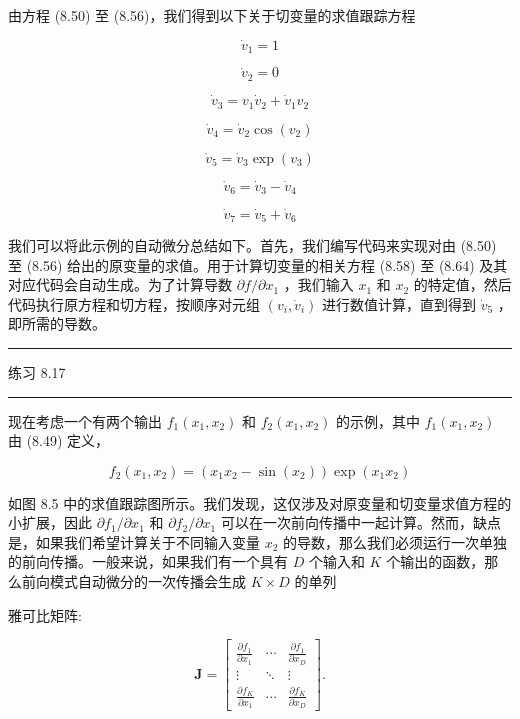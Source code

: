 \documentclass[10pt]{report}
\newcommand{\HRule}{\begin{center}\rule{0.9\linewidth}{0.2mm}\end{center}}
\begin{document}
由方程 (8.50) 至 (8.56)，我们得到以下关于切变量的求值跟踪方程

\[
{\dot{v}}_{1} = 1 \tag{8.58}
\]

\[
{\dot{v}}_{2} = 0 \tag{8.59}
\]

\[
{\dot{v}}_{3} = {v}_{1}{\dot{v}}_{2} + {\dot{v}}_{1}{v}_{2} \tag{8.60}
\]

\[
{\dot{v}}_{4} = {\dot{v}}_{2}\cos \left( {v}_{2}\right)  \tag{8.61}
\]

\[
{\dot{v}}_{5} = {\dot{v}}_{3}\exp \left( {v}_{3}\right)  \tag{8.62}
\]

\[
{\dot{v}}_{6} = {\dot{v}}_{3} - {\dot{v}}_{4} \tag{8.63}
\]

\[
{\dot{v}}_{7} = {\dot{v}}_{5} + {\dot{v}}_{6} \tag{8.64}
\]

我们可以将此示例的自动微分总结如下。首先，我们编写代码来实现对由 (8.50) 至 (8.56) 给出的原变量的求值。用于计算切变量的相关方程 (8.58) 至 (8.64) 及其对应代码会自动生成。为了计算导数 \(\partial f/\partial {x}_{1}\) ，我们输入 \({x}_{1}\) 和 \({x}_{2}\) 的特定值，然后代码执行原方程和切方程，按顺序对元组 \(\left( {{v}_{i},{\dot{v}}_{i}}\right)\) 进行数值计算，直到得到 \({\dot{v}}_{5}\) ，即所需的导数。

\HRule

练习 8.17

\HRule

现在考虑一个有两个输出 \({f}_{1}\left( {{x}_{1},{x}_{2}}\right)\) 和 \({f}_{2}\left( {{x}_{1},{x}_{2}}\right)\) 的示例，其中 \({f}_{1}\left( {{x}_{1},{x}_{2}}\right)\) 由 (8.49) 定义，

\[
{f}_{2}\left( {{x}_{1},{x}_{2}}\right)  = \left( {{x}_{1}{x}_{2} - \sin \left( {x}_{2}\right) }\right) \exp \left( {{x}_{1}{x}_{2}}\right)  \tag{8.65}
\]

如图 8.5 中的求值跟踪图所示。我们发现，这仅涉及对原变量和切变量求值方程的小扩展，因此 \(\partial {f}_{1}/\partial {x}_{1}\) 和 \(\partial {f}_{2}/\partial {x}_{1}\) 可以在一次前向传播中一起计算。然而，缺点是，如果我们希望计算关于不同输入变量 \({x}_{2}\) 的导数，那么我们必须运行一次单独的前向传播。一般来说，如果我们有一个具有 \(D\) 个输入和 \(K\) 个输出的函数，那么前向模式自动微分的一次传播会生成 \(K \times  D\) 的单列

雅可比矩阵:

\[
\mathbf{J} = \left\lbrack  \begin{matrix} \frac{\partial {f}_{1}}{\partial {x}_{1}} & \cdots & \frac{\partial {f}_{1}}{\partial {x}_{D}} \\  \vdots &  \ddots  & \vdots \\  \frac{\partial {f}_{K}}{\partial {x}_{1}} & \cdots & \frac{\partial {f}_{K}}{\partial {x}_{D}} \end{matrix}\right\rbrack  . \tag{8.66}
\]
\end{document}
